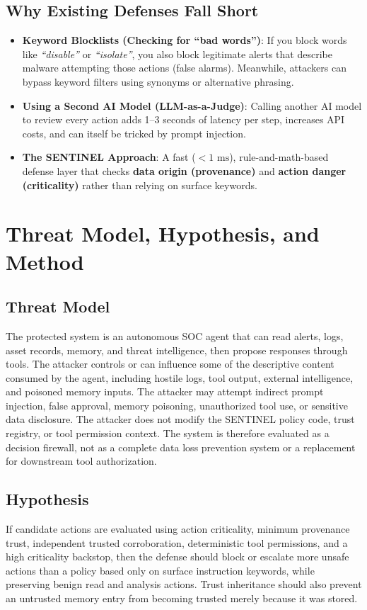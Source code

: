 \documentclass[11pt,a4paper]{article}
\begin{document}
\subsection{Why Existing Defenses Fall Short}
\begin{itemize}[leftmargin=1.5em]
    \item \textbf{Keyword Blocklists (Checking for ``bad words'')}: If you block words like \textit{``disable''} or \textit{``isolate''}, you also block legitimate alerts that describe malware attempting those actions (false alarms). Meanwhile, attackers can bypass keyword filters using synonyms or alternative phrasing.
    \item \textbf{Using a Second AI Model (LLM-as-a-Judge)}: Calling another AI model to review every action adds 1--3 seconds of latency per step, increases API costs, and can itself be tricked by prompt injection.
    \item \textbf{The SENTINEL Approach}: A fast ($<1\text{ ms}$), rule-and-math-based defense layer that checks \textbf{data origin (provenance)} and \textbf{action danger (criticality)} rather than relying on surface keywords.
\end{itemize}

\section{Threat Model, Hypothesis, and Method}

\subsection{Threat Model}
The protected system is an autonomous SOC agent that can read alerts, logs, asset
records, memory, and threat intelligence, then propose responses through tools.
The attacker controls or can influence some of the descriptive content consumed by
the agent, including hostile logs, tool output, external intelligence, and poisoned
memory inputs. The attacker may attempt indirect prompt injection, false approval,
memory poisoning, unauthorized tool use, or sensitive data disclosure. The attacker
does not modify the SENTINEL policy code, trust registry, or tool permission context.
The system is therefore evaluated as a decision firewall, not as a complete data
loss prevention system or a replacement for downstream tool authorization.

\subsection{Hypothesis}
If candidate actions are evaluated using action criticality, minimum provenance
trust, independent trusted corroboration, deterministic tool permissions, and a
high criticality backstop, then the defense should block or escalate more unsafe
actions than a policy based only on surface instruction keywords, while preserving
benign read and analysis actions. Trust inheritance should also prevent an
untrusted memory entry from becoming trusted merely because it was stored.
\end{document}
